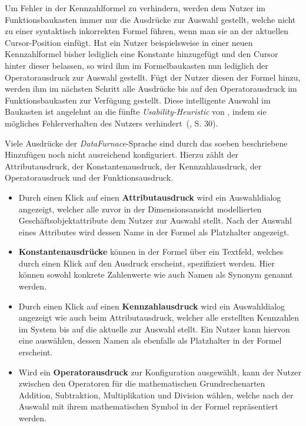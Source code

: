 \documentclass[
  language=german, %
  type=bachelor,%
  ngerman
]{isthesis}
\begin{document}
\begin{content}
  Um Fehler in der Kennzahlformel zu verhindern, werden dem Nutzer im
  Funktionsbaukasten immer nur die Ausdrücke zur Auswahl gestellt, welche nicht
  zu einer syntaktisch inkorrekten Formel führen, wenn man sie an der aktuellen
  Cursor-Position einfügt. Hat ein Nutzer beispielsweise in einer neuen
  Kennzahlformel bisher lediglich eine Konstante hinzugefügt und den Cursor
  hinter dieser belassen, so wird ihm im Formelbaukasten nun lediglich der
  Operatorausdruck zur Auswahl gestellt. Fügt der Nutzer diesen der Formel
  hinzu, werden ihm im nächsten Schritt alle Ausdrücke bis auf den
  Operatorausdruck im Funktionsbaukasten zur Verfügung gestellt. Diese
  intelligente Auswahl im Baukasten ist angelehnt an die fünfte
  \textit{Usability-Heuristic} von \textsc{\citeauthor{nielsen1994heuristic}},
  indem sie mögliches Fehlerverhalten des Nutzers
  verhindert~(\citeyear{nielsen1994heuristic}, S. 30).

  Viele Ausdrücke der \textit{DataFurnace}-Sprache sind durch das soeben
  beschriebene Hinzufügen noch nicht ausreichend konfiguriert. Hierzu zählt der
  Attributausdruck, der Konstantenausdruck, der Kennzahlausdruck, der
  Operatorausdruck und der Funktionsausdruck. 

  \begin{itemize} 
    \item Durch einen Klick auf einen \textbf{Attributausdruck} wird ein Auswahldialog
      angezeigt, welcher alle zuvor in der Dimensionsansicht modellierten
      Geschäftsobjektattribute dem Nutzer zur Auswahl stellt.  Nach der Auswahl
      eines Attributes wird dessen Name in der Formel als Platzhalter
      angezeigt. 
      
    \item  \textbf{Konstantenausdrücke} können in der Formel über ein
      Textfeld, welches durch einen Klick auf den Ausdruck erscheint,
      spezifiziert werden. Hier können sowohl konkrete Zahlenwerte wie auch
      Namen als Synonym genannt werden.

    \item Durch einen Klick auf einen \textbf{Kennzahlausdruck} wird ein
      Auswahldialog angezeigt wie auch beim Attributausdruck, welcher alle
      erstellten Kennzahlen im System bis auf die aktuelle zur Auswahl stellt.
      Ein Nutzer kann hiervon eine auswählen, dessen Namen als ebenfalls als
      Platzhalter in der Formel erscheint.  

    \item Wird ein \textbf{Operatorausdruck} zur Konfiguration ausgewählt,
      kann der Nutzer zwischen den Operatoren für die mathematischen
      Grundrechenarten Addition, Subtraktion, Multiplikation und Division
      wählen, welche nach der Auswahl mit ihrem mathematischen Symbol in der Formel
      repräsentiert werden.


\end{itemize}
\end{content}
\end{document}
